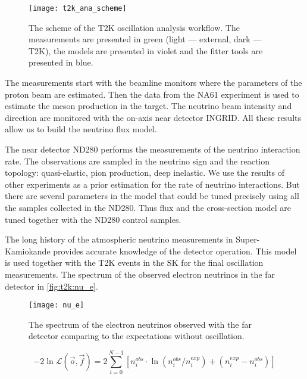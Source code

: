 \documentclass[../main.tex]{subfiles}
\begin{document}
\begin{figure}[!ht]
  \centering
  \texttt{[image: t2k\_ana\_scheme]}
  \caption{The scheme of the T2K oscillation analysis workflow. The measurements are presented in green (light --- external, dark --- T2K), the models are presented in violet and the fitter tools are presented in blue.}
  \label{fig:t2k:ana}
\end{figure}

The measurements start with the beamline monitors where the parameters of the proton beam are estimated. Then the data from the NA61 experiment is used to estimate the meson production in the target. The neutrino beam intensity and direction are monitored with the on-axis near detector INGRID. All these results allow us to build the neutrino flux model.

The near detector ND280 performs the measurements of the neutrino interaction rate. The observations are sampled in the neutrino sign and the reaction topology: quasi-elastic, pion production, deep inelastic. We use the results of other experiments as a prior estimation for the rate of neutrino interactions. But there are several parameters in the model that could be tuned precisely using all the samples collected in the ND280. Thus flux and the cross-section model are tuned together with the ND280 control samples.

The long history of the atmospheric neutrino measurements in Super-Kamiokande provides accurate knowledge of the detector operation. This model is used together with the T2K events in the SK for the final oscillation measurements. The spectrum of the observed electron neutrinos in the far detector  in \autoref{fig:t2k:nu_e}.

\begin{figure}[!ht]
  \centering
  \texttt{[image: nu\_e]}
  \caption{The spectrum of the electron neutrinos observed with the far detector comparing to the expectations without oscillation.}
  \label{fig:t2k:nu_e}
\end{figure}

\begin{equation}
-2\ln\mathcal{L}\left(\overrightarrow{o}, \overrightarrow{f}\right)=2\sum^{N-1}_{i=0}\left[n_i^{obs}\cdot\ln\left(n_i^{obs}/n_i^{exp}\right)+\left(n_i^{exp}-n_i^{obs}\right)\right]
\end{equation}
\end{document}
